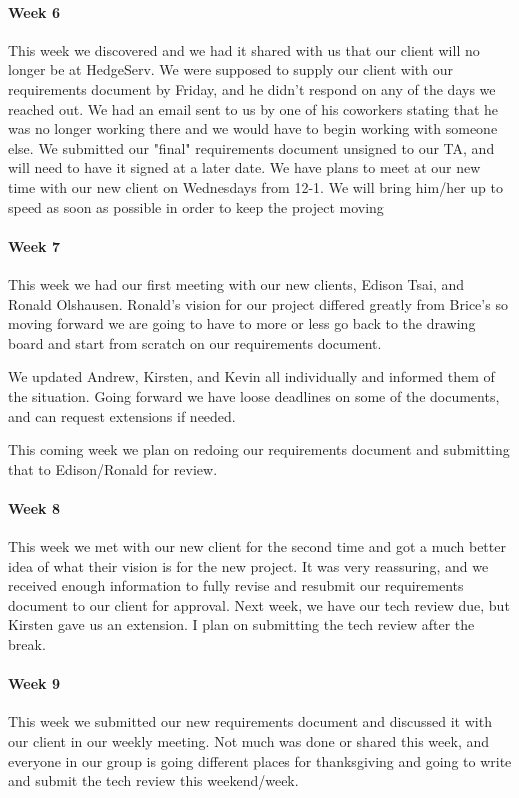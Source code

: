 \documentclass[onecolumn, draftclsnofoot,10pt, compsoc]{IEEEtran}
\begin{document}
\paragraph{Week 6}
This week we discovered and we had it shared with us that our client will no longer be at HedgeServ. We were supposed to supply our client with our requirements document by Friday, and he didn't respond on any of the days we reached out. We had an email sent to us by one of his coworkers stating that he was no longer working there and we would have to begin working with someone else. We submitted our "final" requirements document unsigned to our TA, and will need to have it signed at a later date. We have plans to meet at our new time with our new client on Wednesdays from 12-1. We will bring him/her up to speed as soon as possible in order to keep the project moving 
\paragraph{Week 7}
This week we had our first meeting with our new clients, Edison Tsai, and Ronald Olshausen. Ronald's vision for our project differed greatly from Brice's so moving forward we are going to have to more or less go back to the drawing board and start from scratch on our requirements document. 
 
We updated Andrew, Kirsten, and Kevin all individually and informed them of the situation. Going forward we have loose deadlines on some of the documents, and can request extensions if needed. 
 
This coming week we plan on redoing our requirements document and submitting that to Edison/Ronald for review. 
\paragraph{Week 8}
This week we met with our new client for the second time and got a much better idea of what their vision is for the new project. It was very reassuring, and we received enough information to fully revise and resubmit our requirements document to our client for approval. Next week, we have our tech review due, but Kirsten gave us an extension. I plan on submitting the tech review after the break. 
\paragraph{Week 9}
This week we submitted our new requirements document and discussed it with our client in our weekly meeting. Not much was done or shared this week, and everyone in our group is going different places for thanksgiving and going to write and submit the tech review this weekend/week. 
\end{document}
